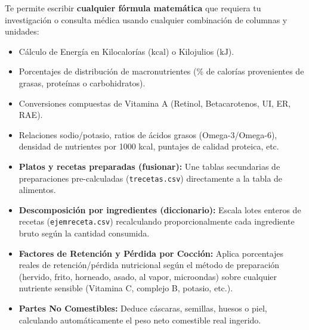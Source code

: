 \documentclass[11pt,a4paper]{article}
\begin{document}
\vspace{0.3cm}

\begin{glassbox}
Te permite escribir \textbf{cualquier fórmula matemática} que requiera tu investigación o consulta médica usando cualquier combinación de columnas y unidades:
\begin{itemize}[label=\textcolor{aeroemerald}{$\checkmark$}]
    \item Cálculo de Energía en Kilocalorías ($\text{kcal}$) o Kilojulios ($\text{kJ}$).
    \item Porcentajes de distribución de macronutrientes (\% de calorías provenientes de grasas, proteínas o carbohidratos).
    \item Conversiones compuestas de Vitamina A (Retinol, Betacarotenos, UI, ER, RAE).
    \item Relaciones sodio/potasio, ratios de ácidos grasos (Omega-3/Omega-6), densidad de nutrientes por 1000 kcal, puntajes de calidad proteica, etc.
\end{itemize}
\end{glassbox}

\vspace{0.3cm}

\begin{glassbox}
\begin{itemize}[label=\textcolor{aeroemerald}{$\checkmark$}]
    \item \textbf{Platos y recetas preparadas (fusionar):} Une tablas secundarias de preparaciones pre-calculadas (\texttt{trecetas.csv}) directamente a la tabla de alimentos.
    \item \textbf{Descomposición por ingredientes (diccionario):} Escala lotes enteros de recetas (\texttt{ejemreceta.csv}) recalculando proporcionalmente cada ingrediente bruto según la cantidad consumida.
    \item \textbf{Factores de Retención y Pérdida por Cocción:} Aplica porcentajes reales de retención/pérdida nutricional según el método de preparación (hervido, frito, horneado, asado, al vapor, microondas) sobre cualquier nutriente sensible (Vitamina C, complejo B, potasio, etc.).
    \item \textbf{Partes No Comestibles:} Deduce cáscaras, semillas, huesos o piel, calculando automáticamente el peso neto comestible real ingerido.
\end{itemize}
\end{glassbox}
\end{document}
